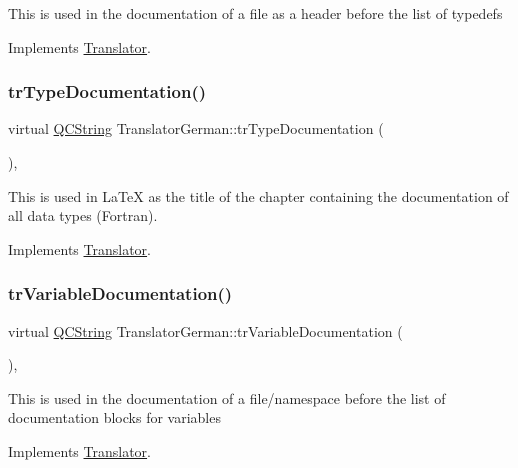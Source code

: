 This is used in the documentation of a file as a header before the list of typedefs 

Implements \mbox{\hyperlink{class_translator}{Translator}}.

\mbox{\label{class_translator_german_abbae0e0621774f368869b4661ce691c1}} 
\subsubsection{\texorpdfstring{trTypeDocumentation()}{trTypeDocumentation()}}
{\footnotesize\ttfamily virtual \mbox{\hyperlink{class_q_c_string}{Q\+C\+String}} Translator\+German\+::tr\+Type\+Documentation (\begin{DoxyParamCaption}{ }\end{DoxyParamCaption})\hspace{0.3cm}{\ttfamily [inline]}, {\ttfamily [virtual]}}

This is used in La\+TeX as the title of the chapter containing the documentation of all data types (Fortran). 

Implements \mbox{\hyperlink{class_translator}{Translator}}.

\mbox{\label{class_translator_german_aa39112aaf2cf48b97fd460a8abce541e}} 
\subsubsection{\texorpdfstring{trVariableDocumentation()}{trVariableDocumentation()}}
{\footnotesize\ttfamily virtual \mbox{\hyperlink{class_q_c_string}{Q\+C\+String}} Translator\+German\+::tr\+Variable\+Documentation (\begin{DoxyParamCaption}{ }\end{DoxyParamCaption})\hspace{0.3cm}{\ttfamily [inline]}, {\ttfamily [virtual]}}

This is used in the documentation of a file/namespace before the list of documentation blocks for variables 

Implements \mbox{\hyperlink{class_translator}{Translator}}.

